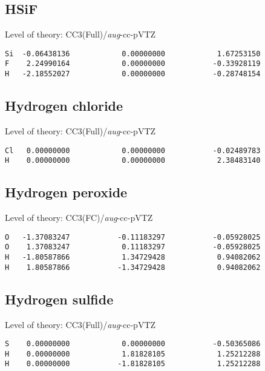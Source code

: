 \documentclass[journal=jctcce,manuscript=article,layout=traditional]{achemso}
\newcommand{\AVTZ}{\emph{aug}-cc-pVTZ}
\begin{document}
\subsection*{HSiF}

\begin{singlespace}
Level of theory: CC3(Full)/{\AVTZ}
\begin{verbatim}
Si  -0.06438136            0.00000000            1.67253150
F    2.24990164            0.00000000           -0.33928119
H   -2.18552027            0.00000000           -0.28748154
\end{verbatim}
\end{singlespace}

\subsection*{Hydrogen chloride}

\begin{singlespace}
Level of theory: CC3(Full)/{\AVTZ}
\begin{verbatim}
Cl   0.00000000            0.00000000           -0.02489783
H    0.00000000            0.00000000            2.38483140
\end{verbatim}
\end{singlespace}

\subsection*{Hydrogen peroxide}

\begin{singlespace}
Level of theory: CC3(FC)/{\AVTZ}
\begin{verbatim}
O   -1.37083247           -0.11183297           -0.05928025
O    1.37083247            0.11183297           -0.05928025
H   -1.80587866            1.34729428            0.94082062
H    1.80587866           -1.34729428            0.94082062
\end{verbatim}
\end{singlespace}

\subsection*{Hydrogen sulfide}

\begin{singlespace}
Level of theory: CC3(Full)/{\AVTZ}
\begin{verbatim}
S    0.00000000            0.00000000           -0.50365086
H    0.00000000            1.81828105            1.25212288
H    0.00000000           -1.81828105            1.25212288
\end{verbatim}
\end{singlespace}
\end{document}

